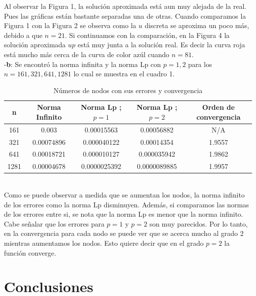 \documentclass[paper=a4, parskip=full, fontsize=12pt]{scrartcl} %
\numberwithin{equation}{section} %
\numberwithin{figure}{section} %
\numberwithin{table}{section} %
\begin{document}
Al observar la Figura 1, la soluci\'on aproximada est\'a aun muy alejada de la real. Pues las gr\'aficas est\'an bastante separadas una de otras. Cuando comparamos la Figura 1 con la Figura 2 se observa como la $u$ discreta se aproxima un poco m\'as, debido a que $n=21$. Si continuamos con la comparaci\'on, en la Figura 4 la soluci\'on aproximada $up$ está muy junta a la soluci\'on real. Es decir la curva roja está mucho m\'as cerca de la curva de color az\'ul cuando $n=81$. \\


-\textbf{b}: Se encontr\'o la norma infinita y la norma Lp con $p = 1, 2$ para los $n = 161, 321, 641, 1281$ lo cual se muestra en el cuadro 1.
\begin{table}[!htbp]
\centering
\caption{N\'umeros de nodos con sus errores y convergencia}
\begin{tabular}{|c|c|c|c|c|}
\hline 
n & Norma Infinito & Norma Lp ; $p=1$ & Norma Lp ; $p=2$ & Orden de convergencia \\ 
\hline 
161 & 0.003 & 0.00015563 & 0.00056882 & N/A \\ 
\hline 
321 & 0.00074896 & 0.000040122 & 0.00014354 & 1.9557 \\ 
\hline 
641 & 0.00018721 & 0.000010127 & 0.000035942 & 1.9862 \\ 
\hline 
1281 & 0.00004678 & 0.0000025392 & 0.0000089885 & 1.9957 \\ 
\hline 
\end{tabular} 
\end{table}\\
Como se puede observar a medida que se aumentan los nodos, la norma infinito de los errores  como  la norma Lp disminuyen. Adem\'as, si comparamos las normas de los errores entre si, se nota que la norma Lp es menor que la norma infinito. Cabe señalar que los errores para $p=1$ y $p=2$ son muy parecidos. Por lo tanto, en la convergencia para cada nodo se puede ver que se acerca mucho al grado 2 mientras aumentamos los nodos. Esto quiere decir que en el grado $p = 2$ la función converge.

\section{Conclusiones}
\end{document}
